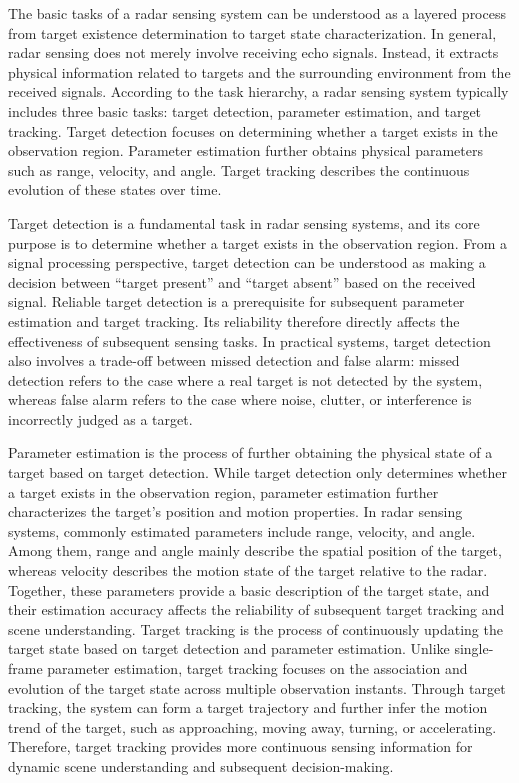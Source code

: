 
The basic tasks of a radar sensing system can be understood as a layered
process from target existence determination to target state characterization.
In general, radar sensing does not merely involve receiving echo signals.
Instead, it extracts physical information related to targets and the surrounding
environment from the received signals.
According to the task hierarchy, a radar sensing system typically includes
three basic tasks: target detection, parameter estimation, and target tracking.
Target detection focuses on determining whether a target exists in the
observation region.
Parameter estimation further obtains physical parameters such as range,
velocity, and angle.
Target tracking describes the continuous evolution of these states over time.

Target detection is a fundamental task in radar sensing systems,
and its core purpose is to determine whether a target exists in the
observation region.
From a signal processing perspective, target detection can be understood as
making a decision between ``target present'' and ``target absent'' based on
the received signal.
Reliable target detection is a prerequisite for subsequent parameter
estimation and target tracking.
Its reliability therefore directly affects the effectiveness of subsequent
sensing tasks.
In practical systems, target detection also involves a trade-off between
missed detection and false alarm:
missed detection refers to the case where a real target is not detected by
the system, whereas false alarm refers to the case where noise, clutter, or
interference is incorrectly judged as a target.

Parameter estimation is the process of further obtaining the physical state
of a target based on target detection.
While target detection only determines whether a target exists in the
observation region, parameter estimation further characterizes the target's
position and motion properties.
In radar sensing systems, commonly estimated parameters include range,
velocity, and angle.
Among them, range and angle mainly describe the spatial position of the target,
whereas velocity describes the motion state of the target relative to the radar.
Together, these parameters provide a basic description of the target state,
and their estimation accuracy affects the reliability of subsequent target
tracking and scene understanding.
Target tracking is the process of continuously updating the target state
based on target detection and parameter estimation.
Unlike single-frame parameter estimation, target tracking focuses on the
association and evolution of the target state across multiple observation
instants.
Through target tracking, the system can form a target trajectory and further
infer the motion trend of the target, such as approaching, moving away,
turning, or accelerating.
Therefore, target tracking provides more continuous sensing information for
dynamic scene understanding and subsequent decision-making.

